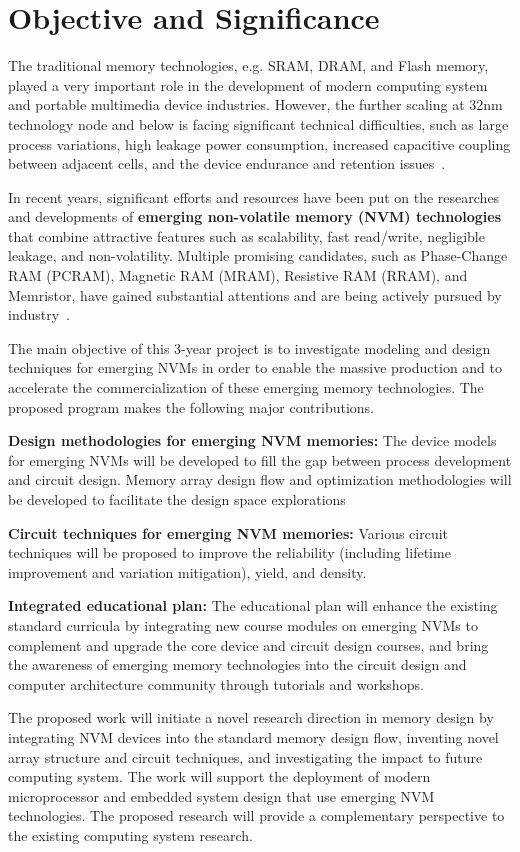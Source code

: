 \section{Objective and Significance}

The traditional memory technologies, e.g. SRAM, DRAM, and Flash memory, played a very important role in the development of modern computing system and portable multimedia device industries. However, the further scaling at 32nm technology node and below is facing significant technical difficulties, such as large process variations, high leakage power consumption, increased capacitive coupling between adjacent cells, and the device endurance and retention issues~\cite{ITRS07,Kinam07}.

In recent years, significant efforts and resources have been put on the researches and developments of \textbf{emerging non-volatile memory (NVM) technologies} that combine attractive features such as scalability, fast read/write, negligible leakage, and non-volatility. Multiple promising candidates, such as Phase-Change RAM (PCRAM), Magnetic RAM (MRAM), Resistive RAM (RRAM), and Memristor, have gained substantial attentions and are being actively pursued by industry~\cite{ITRS07,burr:scm08}.

 The main objective of this 3-year project is to investigate modeling and design techniques for emerging NVMs in order to enable the massive production and to accelerate the commercialization of these emerging memory technologies. The proposed program makes the following major contributions.

\vspace{5pt}
\squishlist
\item {\textbf{Design methodologies for emerging NVM memories:} The device models for emerging NVMs will be developed to fill the gap between process development and circuit design. Memory array design flow and optimization methodologies will be developed to facilitate the design space explorations }
\item {\textbf{Circuit techniques for emerging NVM memories:} Various circuit techniques will be proposed to improve the reliability (including lifetime improvement and variation mitigation), yield, and density.}
\item {\textbf{Integrated educational plan:} The educational plan will enhance the existing standard curricula by integrating new course modules on emerging NVMs to complement and upgrade the core device and circuit design courses, and bring the awareness of emerging memory technologies into the circuit design and computer architecture community through tutorials and workshops.}
\squishend
\vspace{5pt}

The proposed work will initiate a novel research direction in memory design by integrating NVM devices into the standard memory design flow, inventing novel array structure and circuit techniques, and investigating the impact to future computing system. The work will support the deployment of modern microprocessor and embedded system design that use emerging NVM technologies. The proposed research will provide a complementary perspective to the existing computing system research.

